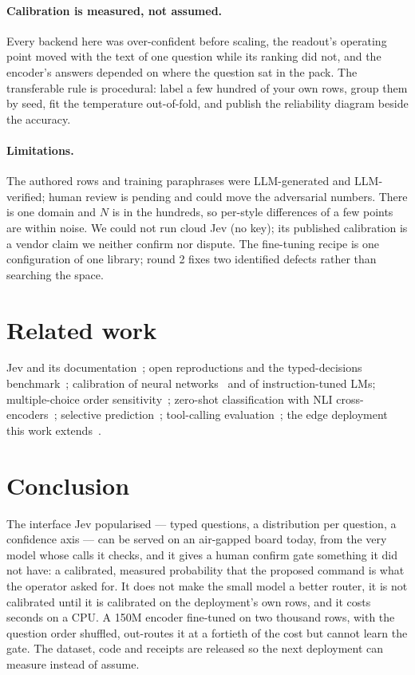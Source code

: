 \documentclass[11pt]{article}
\begin{document}
\paragraph{Calibration is measured, not assumed.} Every backend here was over-confident before
scaling, the readout's operating point moved with the text of one question while its ranking
did not, and
the encoder's answers depended on where the question sat in the pack. The transferable rule is
procedural: label a few hundred of your own rows, group them by seed, fit the temperature
out-of-fold, and publish the reliability diagram beside the accuracy.

\paragraph{Limitations.} The authored rows and training paraphrases were LLM-generated and
LLM-verified; human review is pending and could move the adversarial numbers. There is one
domain and $N$ is in the hundreds, so per-style differences of a few points are within noise.
We could not run cloud Jev (no key); its published calibration is a vendor claim we neither
confirm nor dispute. The fine-tuning recipe is one configuration of one library; round 2 fixes
two identified defects rather than searching the space.

\section{Related work}

Jev and its documentation~\cite{jevblog,jevdocs,jevjagged}; open reproductions
\cite{openjevverdict,laya,openjevdeberta,openjev9b,openjevreadout} and the typed-decisions
benchmark~\cite{typeddecisions}; calibration of neural networks~\cite{guo2017} and of
instruction-tuned LMs; multiple-choice order sensitivity~\cite{zheng2023mcq,pezeshkpour2023};
zero-shot classification with NLI cross-encoders~\cite{yin2019}; selective
prediction~\cite{geifman2017}; tool-calling evaluation~\cite{bfcl}; the edge deployment this
work extends~\cite{lancefindings}.

\section{Conclusion}

The interface Jev popularised --- typed questions, a distribution per question, a confidence
axis --- can be served on an air-gapped board today, from the very model whose calls it checks,
and it gives a human confirm gate something it did not have: a calibrated, measured probability
that the proposed command is what the operator asked for. It does not make the small model a
better router, it is not calibrated until it is calibrated on the deployment's own rows, and it
costs seconds on a CPU. A 150M encoder fine-tuned on two thousand rows, with the question order
shuffled, out-routes it at a fortieth of the cost but cannot learn the gate. The dataset, code
and receipts are released so the next deployment can measure instead of assume.



\end{document}
